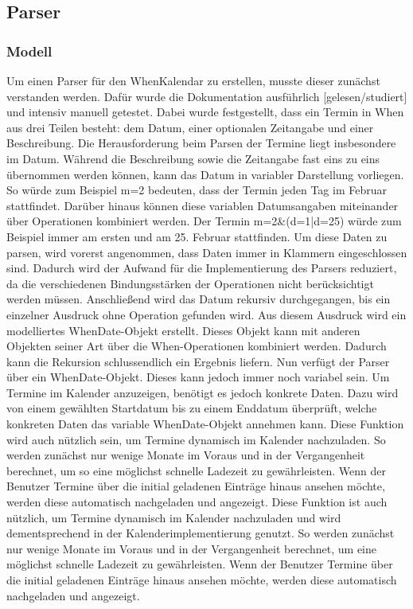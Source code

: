 \subsection{Parser}\label{subsection:imp:parser}
\subsubsection{Modell}
Um einen Parser für den WhenKalendar zu erstellen, musste dieser zunächst verstanden werden. Dafür wurde die Dokumentation ausführlich [gelesen/studiert] und intensiv manuell getestet.\newline%
Dabei wurde festgestellt, dass ein Termin in When aus drei Teilen besteht: dem Datum, einer optionalen Zeitangabe und einer Beschreibung.%
Die Herausforderung beim Parsen der Termine liegt insbesondere im Datum. Während die Beschreibung sowie die Zeitangabe fast eins zu eins übernommen werden können, kann das Datum in variabler Darstellung vorliegen. So würde zum Beispiel \glqq m=2\grqq{} bedeuten, dass der Termin jeden Tag im Februar stattfindet.
Darüber hinaus können diese variablen Datumsangaben miteinander über Operationen kombiniert werden. Der Termin \glqq m=2\&(d=1|d=25)\grqq{} würde zum Beispiel immer am ersten und am 25. Februar stattfinden.
\newline
\myNewSection
Um diese Daten zu parsen, wird vorerst angenommen, dass Daten immer in Klammern eingeschlossen sind. Dadurch wird der Aufwand für die Implementierung des Parsers reduziert, da die verschiedenen Bindungsstärken der Operationen nicht berücksichtigt werden müssen. %
Anschließend wird das Datum rekursiv durchgegangen, bis ein einzelner Ausdruck ohne Operation gefunden wird. Aus diesem Ausdruck wird ein modelliertes WhenDate-Objekt erstellt. Dieses Objekt kann mit anderen Objekten seiner Art über die When-Operationen kombiniert werden. Dadurch kann die Rekursion schlussendlich ein Ergebnis liefern. %
\newline
\myNewSection
Nun verfügt der Parser über ein WhenDate-Objekt. Dieses kann jedoch immer noch variabel sein. Um Termine im Kalender anzuzeigen, benötigt es jedoch konkrete Daten. Dazu wird von einem gewählten Startdatum bis zu einem Enddatum überprüft, welche konkreten Daten das variable WhenDate-Objekt annehmen kann. Diese Funktion wird auch nützlich sein, um Termine dynamisch im Kalender nachzuladen. So werden zunächst nur wenige Monate im Voraus und in der Vergangenheit berechnet, um so eine möglichst schnelle Ladezeit zu gewährleisten. Wenn der Benutzer Termine über die initial geladenen Einträge hinaus ansehen möchte, werden diese automatisch nachgeladen und angezeigt.\newline%
Diese Funktion ist auch nützlich, um Termine dynamisch im Kalender nachzuladen und wird dementsprechend in der Kalenderimplementierung genutzt. So werden zunächst nur wenige Monate im Voraus und in der Vergangenheit berechnet, um eine möglichst schnelle Ladezeit zu gewährleisten. Wenn der Benutzer Termine über die initial geladenen Einträge hinaus ansehen möchte, werden diese automatisch nachgeladen und angezeigt.%
%
%
%
%
%
